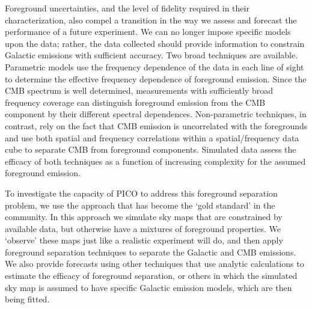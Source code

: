 \documentclass[PICOReport.tex]{subfiles}
\begin{document}

Foreground uncertainties, and the level of fidelity required in their characterization, also compel a transition in the way we assess and forecast the performance of a future experiment. We can no longer impose specific models upon the data; rather, the data collected should provide information to constrain Galactic emissions with sufficient accuracy.  Two broad techniques are available.  Parametric models use the frequency dependence of the data in each line of sight to determine the effective frequency dependence of foreground emission.  Since the CMB spectrum is well determined, measurements with sufficiently broad frequency coverage can distinguish foreground emission from the CMB component by their different spectral dependences.  Non-parametric techniques, in contrast, rely on the fact that CMB emission is uncorrelated with the foregrounds and use both spatial and frequency correlations within a spatial/frequency data cube to separate CMB from foreground components.  Simulated data assess the efficacy of both techniques as a function of increasing complexity for the assumed foreground emission.

To investigate the capacity of PICO to address this foreground separation problem, we use the approach that has become the `gold standard' in the community. In this approach we simulate sky maps that are constrained by available data, but otherwise have a mixtures of foreground properties. We  `observe' these maps just like a realistic experiment will do, and then apply foreground separation techniques to separate the Galactic and CMB emissions. We also provide forecasts using other techniques that use analytic calculations to estimate the efficacy of foreground separation, or others in which the simulated sky map is assumed to have specific Galactic emission models, which are then being fitted. 
\end{document}

